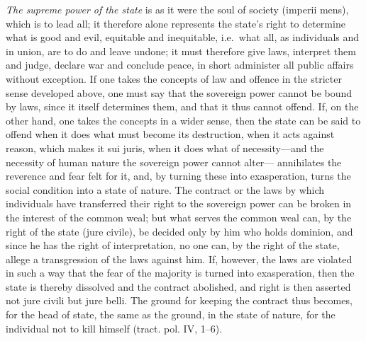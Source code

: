 \documentclass[12pt,a4paper,openany]{book}
\newcommand{\opage}[1]{\marginnote{\footnotesize\textit{[#1]}}}
\begin{document}
\emph{The supreme power of the state} is as it were the soul of society (imperii mens), which is to lead all; it therefore alone represents the state's right to determine what is good and evil, equitable and inequitable, i.e.\ what all, as individuals and in union, are to do and leave undone; it must therefore give laws, interpret them and judge, declare war and conclude peace, in short administer all public affairs without exception. If one takes the concepts of law and offence in the stricter sense developed above, one must say that the sovereign power cannot be bound by laws, since it itself determines them, and that it thus cannot offend. If, on the other hand, one takes the concepts in a wider sense, then the state can be said to offend when it does what must become its destruction, when it acts against reason, which makes it sui juris, when it does what of necessity---and the necessity of human nature the sovereign power cannot alter---
\opage{142}\setcounter{footnote}{0}annihilates the reverence and fear felt for it, and, by turning these into exasperation, turns the social condition into a state of nature. The contract or the laws by which individuals have transferred their right to the sovereign power can be broken in the interest of the common weal; but what serves the common weal can, by the right of the state (jure civile), be decided only by him who holds dominion, and since he has the right of interpretation, no one can, by the right of the state, allege a transgression of the laws against him. If, however, the laws are violated in such a way that the fear of the majority is turned into exasperation, then the state is thereby dissolved and the contract abolished, and right is then asserted not jure civili but jure belli. The ground for keeping the contract thus becomes, for the head of state, the same as the ground, in the state of nature, for the individual not to kill himself (tract. pol. IV, 1--6).
\end{document}
